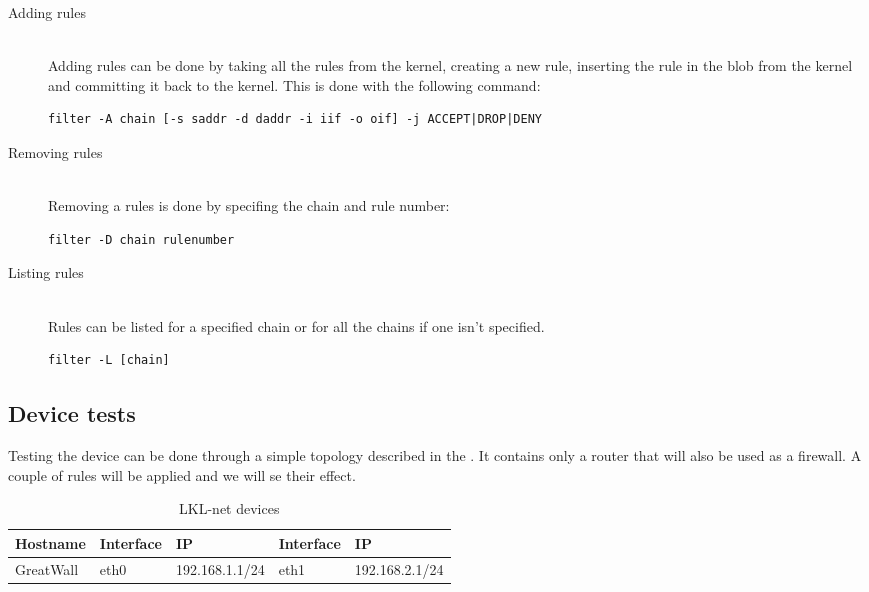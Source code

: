 \begin{description}
\item[Adding rules] \hfill \\
Adding rules can be done by taking all the rules from the kernel, creating a 
new rule, inserting the rule in the blob from the kernel and committing it back
to the kernel. This is done with the following command:
\lstset{language=zsh,caption=Adding a rule,label=lst:saddrule}
\begin{lstlisting}
filter -A chain [-s saddr -d daddr -i iif -o oif] -j ACCEPT|DROP|DENY
\end{lstlisting}
\item[Removing rules] \hfill \\
Removing a rules is done by specifing the chain and rule number:
\lstset{language=zsh,caption=Deleting a rule,label=lst:sdelrule}
\begin{lstlisting}
filter -D chain rulenumber
\end{lstlisting}
\item[Listing rules] \hfill \\
Rules can be listed for a specified chain or for all the chains if one isn't specified.
\lstset{language=zsh,caption=List rules,label=lst:slstrule}
\begin{lstlisting}
filter -L [chain]
\end{lstlisting}
\end{description}

\subsection{Device tests}
\label{sub-sec:firewall-tests}

Testing the device can be done through a simple topology described in the . It contains only a
router that will also be used as a firewall. A couple of rules will be applied and we will se their effect.


\begin{center}
  \begin{table}[htb]
  \begin{center}
  \begin{tabular}{| l | l | l | l | l |}
    \hline
      Hostname & Interface & IP & Interface & IP \\ \hline
      GreatWall & eth0 & 192.168.1.1/24 & eth1 & 192.168.2.1/24 \\ 
    \hline
  \end{tabular}
  \end{center}
  \caption{LKL-net devices}
  \label{table:tdevices}
  \end{table}
\end{center}

